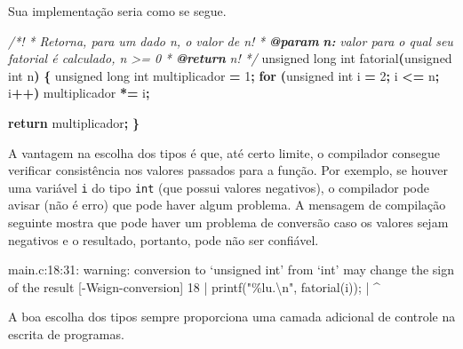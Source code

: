\documentclass[
  11pt,
  a4paper,
]{scrbook}
\newenvironment{Shaded}{\begin{snugshade}}{\end{snugshade}}
\newcommand{\AnnotationTok}[1]{\textcolor[rgb]{0.56,0.35,0.01}{\textbf{\textit{#1}}}}
\newcommand{\CommentTok}[1]{\textcolor[rgb]{0.56,0.35,0.01}{\textit{#1}}}
\newcommand{\CommentVarTok}[1]{\textcolor[rgb]{0.56,0.35,0.01}{\textbf{\textit{#1}}}}
\newcommand{\ControlFlowTok}[1]{\textcolor[rgb]{0.13,0.29,0.53}{\textbf{#1}}}
\newcommand{\DataTypeTok}[1]{\textcolor[rgb]{0.13,0.29,0.53}{#1}}
\newcommand{\DecValTok}[1]{\textcolor[rgb]{0.00,0.00,0.81}{#1}}
\newcommand{\NormalTok}[1]{#1}
\newcommand{\OperatorTok}[1]{\textcolor[rgb]{0.81,0.36,0.00}{\textbf{#1}}}
\begin{document}
Sua implementação seria como se segue.

\begin{Shaded}
\begin{Highlighting}[]
\CommentTok{/*!}
\CommentTok{ * Retorna, para um dado n, o valor de n!}
\CommentTok{ * }\AnnotationTok{@param}\CommentTok{ }\CommentVarTok{n:}\CommentTok{ valor para o qual seu fatorial é calculado, n \textgreater{}= 0}
\CommentTok{ * }\AnnotationTok{@return}\CommentTok{ n!}
\CommentTok{ */}
\DataTypeTok{unsigned} \DataTypeTok{long} \DataTypeTok{int}\NormalTok{ fatorial}\OperatorTok{(}\DataTypeTok{unsigned} \DataTypeTok{int}\NormalTok{ n}\OperatorTok{)} \OperatorTok{\{}
    \DataTypeTok{unsigned} \DataTypeTok{long} \DataTypeTok{int}\NormalTok{ multiplicador }\OperatorTok{=} \DecValTok{1}\OperatorTok{;}
    \ControlFlowTok{for} \OperatorTok{(}\DataTypeTok{unsigned} \DataTypeTok{int}\NormalTok{ i }\OperatorTok{=} \DecValTok{2}\OperatorTok{;}\NormalTok{ i }\OperatorTok{\textless{}=}\NormalTok{ n}\OperatorTok{;}\NormalTok{ i}\OperatorTok{++)}
\NormalTok{        multiplicador }\OperatorTok{*=}\NormalTok{ i}\OperatorTok{;}

    \ControlFlowTok{return}\NormalTok{ multiplicador}\OperatorTok{;}
\OperatorTok{\}}
\end{Highlighting}
\end{Shaded}

A vantagem na escolha dos tipos é que, até certo limite, o compilador
consegue verificar consistência nos valores passados para a função. Por
exemplo, se houver uma variável \texttt{i} do tipo \texttt{int} (que
possui valores negativos), o compilador pode avisar (não é erro) que
pode haver algum problema. A mensagem de compilação seguinte mostra que
pode haver um problema de conversão caso os valores sejam negativos e o
resultado, portanto, pode não ser confiável.

\begin{Shaded}
\begin{Highlighting}[]
\NormalTok{main.c:18:31: warning: conversion to ‘unsigned int’ from ‘int’ may change}
\NormalTok{the sign of the result [{-}Wsign{-}conversion]}
\NormalTok{   18 |     printf("\%lu.\textbackslash{}n", fatorial(i));}
\NormalTok{      |                               \^{}}
\end{Highlighting}
\end{Shaded}

A boa escolha dos tipos sempre proporciona uma camada adicional de
controle na escrita de programas.
\end{document}
